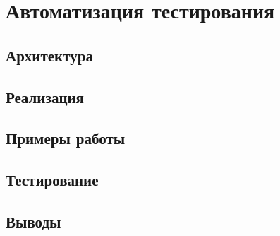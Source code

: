 \chapter{Автоматизация тестирования}
\section{Архитектура}
\section{Реализация}
\section{Примеры работы}
\section{Тестирование}
\section{Выводы}